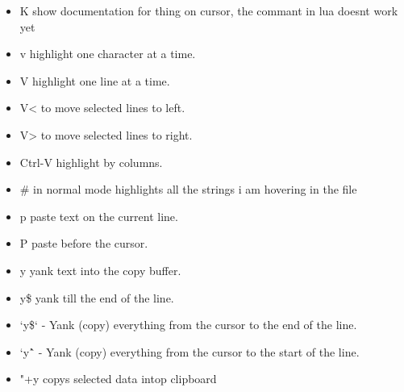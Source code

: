 \documentclass[12pt]{article}
\begin{document}
\begin{itemize}
    \item K show documentation for thing on cursor, the commant in lua doesnt work yet 
    \item v highlight one character at a time.
    \item V highlight one line at a time.
    \item V< to move selected lines to left.
    \item V> to move selected lines to right.
    \item Ctrl-V highlight by columns.
    \item \# in normal mode highlights all the strings i am hovering in the file 
    \item p paste text on the current line.
    \item P paste before the cursor.
    \item y yank text into the copy buffer.
    \item y\$ yank till the end of the line.
    \item `y\$` - Yank (copy) everything from the cursor to the end of the line.
    \item `y\^` - Yank (copy) everything from the cursor to the start of the line.\\
    \item "+y copys selected data intop clipboard \\
\end{itemize}
\end{document}
